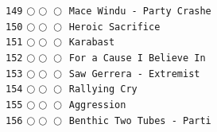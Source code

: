 \documentclass[a4paper,landscape]{article}
\begin{document}
\begin{multicols*}{5}
\texttt{149} \(\bigcirc\!\bigcirc\!\bigcirc\)  \texttt{Mace Windu - Party Crashe} \vspace{-0.3mm}\\ 
\texttt{150} \(\bigcirc\!\bigcirc\!\bigcirc\)  \texttt{Heroic Sacrifice} \vspace{-0.3mm}\\ 
\texttt{151} \(\bigcirc\!\bigcirc\!\bigcirc\)  \texttt{Karabast} \vspace{-0.3mm}\\ 
\texttt{152} \(\bigcirc\!\bigcirc\!\bigcirc\)  \texttt{For a Cause I Believe In} \vspace{-0.3mm}\\ 
\texttt{153} \(\bigcirc\!\bigcirc\!\bigcirc\)  \texttt{Saw Gerrera - Extremist} \vspace{-0.3mm}\\ 
\texttt{154} \(\bigcirc\!\bigcirc\!\bigcirc\)  \texttt{Rallying Cry} \vspace{-0.3mm}\\ 
\texttt{155} \(\bigcirc\!\bigcirc\!\bigcirc\)  \texttt{Aggression} \vspace{-0.3mm}\\ 
\texttt{156} \(\bigcirc\!\bigcirc\!\bigcirc\)  \texttt{Benthic Two Tubes - Parti} \vspace{-0.3mm}\\ 

\end{multicols*}
\end{document}
